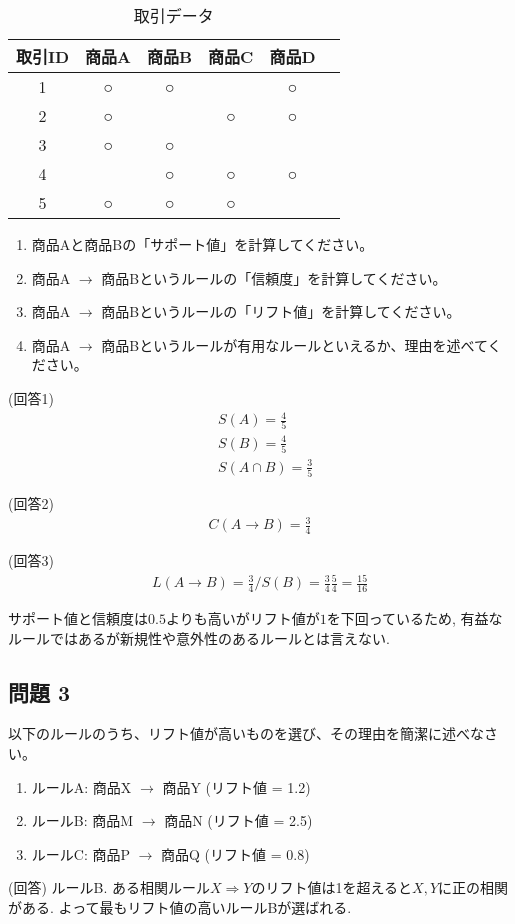 \documentclass[dvipdfmx, 10pt]{jsarticle}
\begin{document}
\begin{table}[h]
\centering
\begin{tabular}{cccccc}
\toprule
取引ID & 商品A & 商品B & 商品C & 商品D \\
\midrule
1 & ○ & ○ &  & ○ \\
2 & ○ &  & ○ & ○ \\
3 & ○ & ○ &  &  \\
4 &  & ○ & ○ & ○ \\
5 & ○ & ○ & ○ &  \\
\bottomrule
\end{tabular}
\caption{取引データ}
\end{table}

\begin{enumerate}
    \item 商品Aと商品Bの「サポート値」を計算してください。
    \item 商品A $\rightarrow$ 商品Bというルールの「信頼度」を計算してください。
    \item 商品A $\rightarrow$ 商品Bというルールの「リフト値」を計算してください。
    \item 商品A $\rightarrow$ 商品Bというルールが有用なルールといえるか、理由を述べてください。
\end{enumerate}

(回答1)
\begin{align*}
    & S(A) = \frac{4}{5}\\
    & S(B) = \frac{4}{5}\\
    & S(A \cap B) = \frac{3}{5}
\end{align*}

(回答2)
\begin{align*}
    C(A \rightarrow B) = \frac{3}{4}
\end{align*}

(回答3)
\begin{align*}
    L(A \rightarrow B) = \frac{3}{4} / S(B) = \frac{3}{4} \frac{5}{4} = \frac{15}{16}
\end{align*}

サポート値と信頼度は\(0.5\)よりも高いがリフト値が\(1\)を下回っているため, 
有益なルールではあるが新規性や意外性のあるルールとは言えない. 

\subsection*{問題 3}
以下のルールのうち、リフト値が高いものを選び、その理由を簡潔に述べなさい。

\begin{enumerate}
    \item ルールA: 商品X $\rightarrow$ 商品Y (リフト値 = 1.2)
    \item ルールB: 商品M $\rightarrow$ 商品N (リフト値 = 2.5)
    \item ルールC: 商品P $\rightarrow$ 商品Q (リフト値 = 0.8)
\end{enumerate}

(回答)
ルールB. ある相関ルール\(X \Rightarrow Y\)のリフト値は1を超えると\(X, Y\)に正の相関がある. 
よって最もリフト値の高いルールBが選ばれる. 
\end{document}
